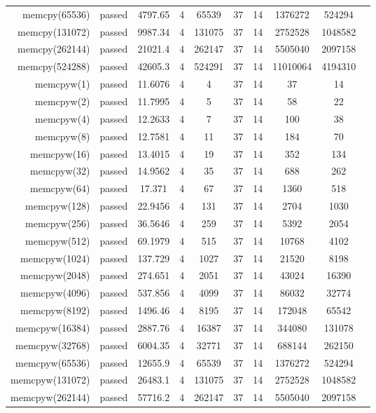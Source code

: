 \begin{longtable}{r|ccccccccc}
    memcpy(65536) & passed & 4797.65 & 4 & 65539 & 37 & 14 & 1376272 & 524294 \\
    memcpy(131072) & passed & 9987.34 & 4 & 131075 & 37 & 14 & 2752528 & 1048582 \\
    memcpy(262144) & passed & 21021.4 & 4 & 262147 & 37 & 14 & 5505040 & 2097158 \\
    memcpy(524288) & passed & 42605.3 & 4 & 524291 & 37 & 14 & 11010064 & 4194310 \\
    memcpyw(1) & passed & 11.6076 & 4 & 4 & 37 & 14 & 37 & 14 \\
    memcpyw(2) & passed & 11.7995 & 4 & 5 & 37 & 14 & 58 & 22 \\
    memcpyw(4) & passed & 12.2633 & 4 & 7 & 37 & 14 & 100 & 38 \\
    memcpyw(8) & passed & 12.7581 & 4 & 11 & 37 & 14 & 184 & 70 \\
    memcpyw(16) & passed & 13.4015 & 4 & 19 & 37 & 14 & 352 & 134 \\
    memcpyw(32) & passed & 14.9562 & 4 & 35 & 37 & 14 & 688 & 262 \\
    memcpyw(64) & passed & 17.371 & 4 & 67 & 37 & 14 & 1360 & 518 \\
    memcpyw(128) & passed & 22.9456 & 4 & 131 & 37 & 14 & 2704 & 1030 \\
    memcpyw(256) & passed & 36.5646 & 4 & 259 & 37 & 14 & 5392 & 2054 \\
    memcpyw(512) & passed & 69.1979 & 4 & 515 & 37 & 14 & 10768 & 4102 \\
    memcpyw(1024) & passed & 137.729 & 4 & 1027 & 37 & 14 & 21520 & 8198 \\
    memcpyw(2048) & passed & 274.651 & 4 & 2051 & 37 & 14 & 43024 & 16390 \\
    memcpyw(4096) & passed & 537.856 & 4 & 4099 & 37 & 14 & 86032 & 32774 \\
    memcpyw(8192) & passed & 1496.46 & 4 & 8195 & 37 & 14 & 172048 & 65542 \\
    memcpyw(16384) & passed & 2887.76 & 4 & 16387 & 37 & 14 & 344080 & 131078 \\
    memcpyw(32768) & passed & 6004.35 & 4 & 32771 & 37 & 14 & 688144 & 262150 \\
    memcpyw(65536) & passed & 12655.9 & 4 & 65539 & 37 & 14 & 1376272 & 524294 \\
    memcpyw(131072) & passed & 26483.1 & 4 & 131075 & 37 & 14 & 2752528 & 1048582 \\
    memcpyw(262144) & passed & 57716.2 & 4 & 262147 & 37 & 14 & 5505040 & 2097158 \\

\end{longtable}
